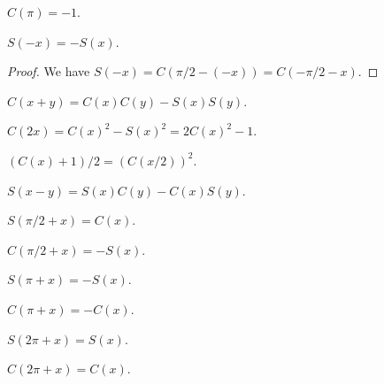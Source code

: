 \begin{proposition}
$C(\pi)=-1$.
\end{proposition}

\begin{proposition}
$S(-x) = -S(x)$.
\end{proposition}
\begin{proof}
We have $S(-x) = C(\pi/2 - (-x)) = C(-\pi/2 - x)$.
\end{proof}

\begin{proposition}
$C(x+y) = C(x)C(y) - S(x)S(y)$.
\end{proposition}

\begin{proposition}
$C(2x) = C(x)^{2} - S(x)^{2} = 2C(x)^{2} - 1$.
\end{proposition}

\begin{proposition}
$(C(x) + 1)/2 = (C(x/2))^{2}$.
\end{proposition}

\begin{proposition}
$S(x-y) = S(x)C(y) - C(x)S(y)$.
\end{proposition}

\begin{proposition}
$S(\pi/2 + x) = C(x)$.
\end{proposition}

\begin{proposition}
$C(\pi/2 + x) = -S(x)$.
\end{proposition}

\begin{proposition}
$S(\pi + x) = - S(x)$.
\end{proposition}

\begin{proposition}
$C(\pi + x) = -C(x)$.
\end{proposition}

\begin{proposition}
$S(2\pi + x) = S(x)$.
\end{proposition}

\begin{proposition}
$C(2\pi + x) = C(x)$.
\end{proposition}
